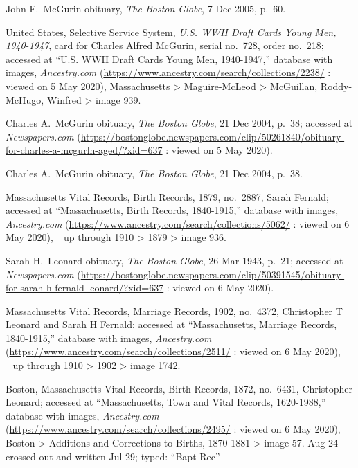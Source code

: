 \begin{thebibliography}{999}
John F.\ McGurin obituary, \textit{The Boston Globe}, 7 Dec 2005, p.\ 60.

United States, Selective Service System, \textit{U.S. WWII Draft Cards Young Men, 1940-1947}, card for Charles Alfred McGurin, serial no.\ 728, order no.\ 218; accessed at ``U.S. WWII Draft Cards Young Men, 1940-1947,'' database with images, \textit{Ancestry.com} (\url{https://www.ancestry.com/search/collections/2238/} : viewed on 5 May 2020), Massachusetts > Maguire-McLeod > McGuillan, Roddy-McHugo, Winfred > image 939.

Charles A.\ McGurin obituary, \textit{The Boston Globe}, 21 Dec 2004, p.\ 38; accessed at \textit{Newspapers.com} (\url{https://bostonglobe.newspapers.com/clip/50261840/obituary-for-charles-a-mcgurln-aged/?xid=637} : viewed on 5 May 2020).

Charles A.\ McGurin obituary, \textit{The Boston Globe}, 21 Dec 2004, p.\ 38.


Massachusetts Vital Records, Birth Records, 1879, no.\ 2887, Sarah Fernald; accessed at ``Massachusetts, Birth Records, 1840-1915,'' database with images, \textit{Ancestry.com} (\url{https://www.ancestry.com/search/collections/5062/} : viewed on 6 May 2020), \_up through 1910 > 1879 > image 936.

Sarah H.\ Leonard obituary, \textit{The Boston Globe}, 26 Mar 1943, p.\ 21; accessed at \textit{Newspapers.com} (\url{https://bostonglobe.newspapers.com/clip/50391545/obituary-for-sarah-h-fernald-leonard/?xid=637} : viewed on 6 May 2020).

Massachusetts Vital Records, Marriage Records, 1902, no.\ 4372, Christopher T Leonard and Sarah H Fernald; accessed at ``Massachusetts, Marriage Records, 1840-1915,'' database with images, \textit{Ancestry.com} (\url{https://www.ancestry.com/search/collections/2511/} : viewed on 6 May 2020), \_up through 1910 > 1902 > image 1742.

Boston, Massachusetts Vital Records, Birth Records, 1872, no.\ 6431, Christopher Leonard; accessed at ``Massachusetts, Town and Vital Records, 1620-1988,'' database with images, \textit{Ancestry.com} (\url{https://www.ancestry.com/search/collections/2495/} : viewed on 6 May 2020), Boston > Additions and Corrections to Births, 1870-1881 > image 57. Aug 24 crossed out and written Jul 29; typed: ``Bapt Rec''


\end{thebibliography}
